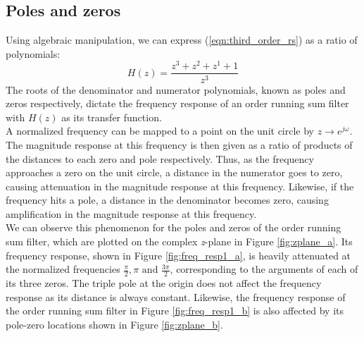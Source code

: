 \documentclass[journal]{IEEEtran}
\begin{document}
\subsection{Poles and zeros}
Using algebraic manipulation, we can express (\ref{eqn:third_order_rs}) as a ratio of polynomials:  
\begin{equation}
\label{eqn:third_order_rs_tf}
    H(z) = \frac{z^3+z^2+z^1+1}{z^3}
\end{equation}
The roots of the denominator and numerator polynomials, known as poles and zeros respectively, dictate the frequency response of an  order running sum filter with $H(z)$ as its transfer function. \\
A normalized frequency can be mapped to a point on the unit circle by $z \rightarrow e^{j \omega}$. The magnitude response at this frequency is then given as a ratio of products of the distances to each zero and pole respectively. Thus, as the frequency approaches a zero on the unit circle, a distance in the numerator goes to zero, causing attenuation in the magnitude response at this frequency. Likewise, if the frequency hits a pole, a distance in the denominator becomes zero, causing amplification in the magnitude response at this frequency. \\
We can observe this phenomenon for the poles and zeros of the  order running sum filter, which are plotted on the complex \textit{z}-plane in Figure \ref{fig:zplane_a}. Its frequency response, shown in Figure \ref{fig:freq_resp1_a}, is heavily attenuated at the normalized frequencies $\frac{\pi}{2}, \pi \text{ and } \frac{3 \pi}{2}$, corresponding to the arguments of each of its three zeros. The triple pole at the origin does not affect the frequency response as its distance is always constant. Likewise, the frequency response of the  order running sum filter in Figure \ref{fig:freq_resp1_b} is also affected by its pole-zero locations shown in Figure \ref{fig:zplane_b}. 
\end{document}
